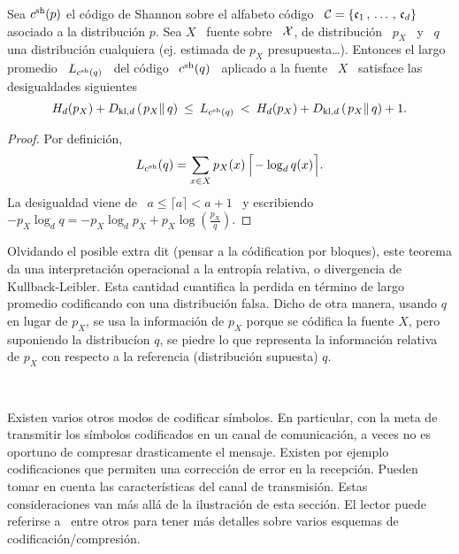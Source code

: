 \begin{teorema}
\label{Teo:SZ:CodigoFalsoShannon}
%
Sea $c^{\mathrm{sh}}(p)$  el c\'odigo  de Shannon sobre  el alfabeto  c\'odigo \ $\mathcal{C}  = \{
\mathfrak{c}_1 \, , \, \ldots \, ,  \, \mathfrak{c}_d \}$ asociado a la distribuci\'on $p$.  Sea
$X$  \  fuente  sobre  \  $\mathcal{X}$,  de  distribuci\'on  \  $p_X$  \  y  \  $q$  una
distribuci\'on cualquiera (ej.   estimada de $p_X$ presupuesta\ldots).  Entonces
el largo promedio  \ $L_{c^{\mathrm{sh}}(q)}$ \ del c\'odigo \ $c^{\mathrm{sh}}(q)$  \ aplicado a la
fuente \ $X$ \ satisface las desigualdades siguientes
  \[
  H_d(p_X) +  D_{\mathrm{kl},d}\left( \left.  p_X \right\| q  \right) \:  \le \:
  L_{c^{\mathrm{sh}}(q)} \: < \: H_d(p_X)  + D_{\mathrm{kl},d}\left( \left. p_X \right\| q
  \right) + 1.
  \]
\end{teorema}
%
\begin{proof}
  Por definici\'on,
  \[
  L_{c^{\mathrm{sh}}}(q) = \sum_{x \in X} p_X(x) \, \Big\lceil\! -\log_d q(x) \Big\rceil.
  \]
  La desigualdad viene de  \ $a \le \lceil a \rceil < a +  1$ \ y escribiendo $-
  p_X \log_d q = - p_X \log_d p_X + p_X \log \left( \frac{p_X}{q} \right)$.
\end{proof}
%
Olvidando el  posible extra dit (pensar  a la c\'odification  por bloques), este
teorema  da  una  interpretaci\'on  operacional  a  la  entrop\'ia  relativa,  o
divergencia  de  Kullback-Leibler.   Esta  cantidad  cuantifica  la  perdida  en
t\'ermino de largo  promedio codificando con una distribuci\'on  falsa. Dicho de
otra manera,  usando $q$  en lugar de  $p_X$, se  usa la informaci\'on  de $p_X$
porque se  c\'odifica la fuente $X$,  pero suponiendo la  distribuc\'ion $q$, se
piedre lo  que representa la  informaci\'on relativa de  $p_X$ con respecto  a la
referencia (distribuci\'on supuesta) $q$.

\

Existen varios otros  modos de codificar s\'imbolos. En  particular, con la meta
de transmitir los s\'imbolos codificados  en un canal de comunicaci\'on, a veces
no  es oportuno  de compresar  drasticamente  el mensaje.   Existen por  ejemplo
codificaciones que permiten una correcci\'on  de error en la recepci\'on. Pueden
tomar  en  cuenta  las  caracter\'isticas  del canal  de  transmisi\'on.   Estas
consideraciones  van m\'as  all\'a de  la ilustraci\'on  de esta  secci\'on.  El
lector puede referirse a~\cite{Ber74, Gal78, Say03, CovTho06, Rio07} entre otros
para tener m\'as detalles sobre varios esquemas de codificaci\'on/compresi\'on.


